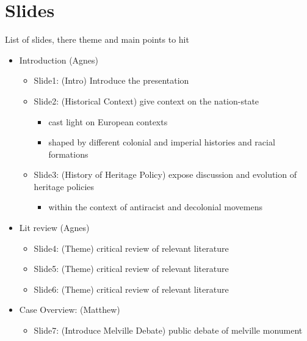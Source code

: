 \documentclass{scrartcl}
\begin{document}
\section{ Slides}

List of slides, there theme and main points to hit

\begin{itemize}
    \item Introduction (Agnes)
    \begin{itemize}
        \item Slide1: (Intro) Introduce the presentation    
        \item Slide2: (Historical Context) give context on the nation-state    
        \begin{itemize}
            \item cast light on European contexts 
            \item shaped by different colonial and imperial histories and racial formations
        \end{itemize}        
        \item Slide3: (History of Heritage Policy) expose discussion and evolution of heritage policies        
        \begin{itemize}
            \item within the context of antiracist and decolonial movemens
        \end{itemize}
    \end{itemize}
    \item Lit review (Agnes)
    \begin{itemize}
        \item Slide4: (Theme) critical review of relevant literature
    \end{itemize}
    \begin{itemize}
        \item Slide5: (Theme) critical review of relevant literature
    \end{itemize}
    \begin{itemize}
        \item Slide6: (Theme) critical review of relevant literature
    \end{itemize}
    \item Case Overview: (Matthew)
    \begin{itemize}
        \item Slide7: (Introduce Melville Debate) public debate of melville monument 
        \begin{itemize}

\end{itemize}
\end{itemize}
\end{itemize}
\end{document}
